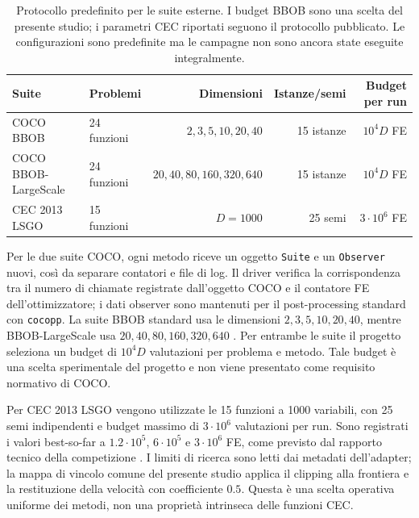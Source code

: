 \begin{table}[t]
\centering
\caption{Protocollo predefinito per le suite esterne. I budget BBOB sono una
scelta del presente studio; i parametri CEC riportati seguono il protocollo
pubblicato. Le configurazioni sono predefinite ma le campagne non sono ancora
state eseguite integralmente.}
\label{tab:external-benchmarks}
\small
\begin{tabularx}{\textwidth}{@{}lXrrr@{}}
\toprule
Suite & Problemi & Dimensioni & Istanze/semi & Budget per run \\
\midrule
COCO BBOB & 24 funzioni & $2,3,5,10,20,40$ & 15 istanze & $10^4 D$ FE \\
COCO BBOB-LargeScale & 24 funzioni & $20,40,80,160,320,640$ & 15 istanze & $10^4 D$ FE \\
CEC 2013 LSGO & 15 funzioni & $D=1000$ & 25 semi & $3\cdot10^6$ FE \\
\bottomrule
\end{tabularx}
\end{table}

Per le due suite COCO, ogni metodo riceve un oggetto \texttt{Suite} e un
\texttt{Observer} nuovi, così da separare contatori e file di log. Il driver
verifica la corrispondenza tra il numero di chiamate registrate dall'oggetto
COCO e il contatore FE dell'ottimizzatore; i dati observer sono mantenuti per
il post-processing standard con \texttt{cocopp}. La suite BBOB standard usa le
dimensioni $2,3,5,10,20,40$, mentre BBOB-LargeScale usa $20,40,80,160,320,640$
\citep{Varelas2020}. Per entrambe le suite il progetto seleziona un budget di
$10^4D$ valutazioni per problema e metodo. Tale budget è una scelta
sperimentale del progetto e non viene presentato come requisito normativo di
COCO.

Per CEC 2013 LSGO vengono utilizzate le 15 funzioni a 1000 variabili, con 25
semi indipendenti e budget massimo di $3\cdot10^6$ valutazioni per run. Sono
registrati i valori best-so-far a $1.2\cdot10^5$, $6\cdot10^5$ e
$3\cdot10^6$ FE, come previsto dal rapporto tecnico della competizione
\citep{Li2013}. I limiti di ricerca sono letti dai metadati dell'adapter; la
mappa di vincolo comune del presente studio applica il clipping alla frontiera
e la restituzione della velocità con coefficiente $0.5$. Questa è una scelta
operativa uniforme dei metodi, non una proprietà intrinseca delle funzioni CEC.

